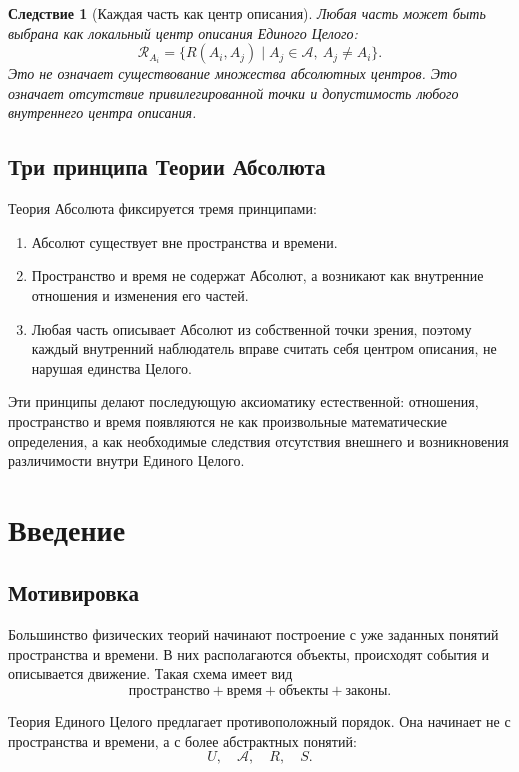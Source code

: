 \documentclass[12pt,a4paper,oneside]{book}
\theoremstyle{definition}
\theoremstyle{plain}
\newtheorem{corollary}{Следствие}[chapter]
\theoremstyle{remark}
\newcommand{\Whole}{U}
\newcommand{\Parts}{\mathcal A}
\newcommand{\Rel}{R}
\newcommand{\State}{S}
\begin{document}
\begin{corollary}[Каждая часть как центр описания]
Любая часть может быть выбрана как локальный центр описания Единого Целого:
\[
\mathcal R_{A_i}=\{\Rel(A_i,A_j)\mid A_j\in\Parts,\ A_j\neq A_i\}.
\]
Это не означает существование множества абсолютных центров. Это означает отсутствие привилегированной точки и допустимость любого внутреннего центра описания.
\end{corollary}

\section{Три принципа Теории Абсолюта}

Теория Абсолюта фиксируется тремя принципами:

\begin{enumerate}
    \item Абсолют существует вне пространства и времени.
    \item Пространство и время не содержат Абсолют, а возникают как внутренние отношения и изменения его частей.
    \item Любая часть описывает Абсолют из собственной точки зрения, поэтому каждый внутренний наблюдатель вправе считать себя центром описания, не нарушая единства Целого.
\end{enumerate}

Эти принципы делают последующую аксиоматику естественной: отношения, пространство и время появляются не как произвольные математические определения, а как необходимые следствия отсутствия внешнего и возникновения различимости внутри Единого Целого.

\chapter{Введение}

\section{Мотивировка}

Большинство физических теорий начинают построение с уже заданных понятий пространства и времени. В них располагаются объекты, происходят события и описывается движение. Такая схема имеет вид
\[
\text{пространство} + \text{время} + \text{объекты} + \text{законы}.
\]

Теория Единого Целого предлагает противоположный порядок. Она начинает не с пространства и времени, а с более абстрактных понятий:
\[
\Whole,\quad \Parts,\quad \Rel,\quad \State.
\]
\end{document}
